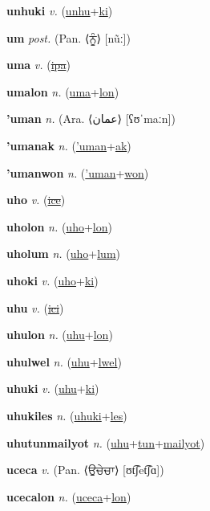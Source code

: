 \textbf{\hypertarget{unhuki}{unhuki}} \textit{v.} (\hyperlink{unhu}{unhu}+\allowbreak \hyperlink{ki}{ki})


\textbf{\hypertarget{um}{um}} \textit{post.} (Pan. ⟨{\gurmukhi{}ਨੂੰ}⟩ [nũː])


\textbf{\hypertarget{uma}{uma}} \textit{v.} (\hyperlink{ipa}{\sout{ipa}})


\textbf{\hypertarget{umalon}{umalon}} \textit{n.} (\hyperlink{uma}{uma}+\allowbreak \hyperlink{lon}{lon})


\textbf{\hypertarget{'uman}{'uman}} \textit{n.} (Ara. ⟨{\arabics{}عمان‎}⟩ [ʕʊˈmaːn])


\textbf{\hypertarget{'umanak}{'umanak}} \textit{n.} (\hyperlink{'uman}{'uman}+\allowbreak \hyperlink{ak}{ak})


\textbf{\hypertarget{'umanwon}{'umanwon}} \textit{n.} (\hyperlink{'uman}{'uman}+\allowbreak \hyperlink{won}{won})


\textbf{\hypertarget{uho}{uho}} \textit{v.} (\hyperlink{ice}{\sout{ice}})


\textbf{\hypertarget{uholon}{uholon}} \textit{n.} (\hyperlink{uho}{uho}+\allowbreak \hyperlink{lon}{lon})


\textbf{\hypertarget{uholum}{uholum}} \textit{n.} (\hyperlink{uho}{uho}+\allowbreak \hyperlink{lum}{lum})


\textbf{\hypertarget{uhoki}{uhoki}} \textit{v.} (\hyperlink{uho}{uho}+\allowbreak \hyperlink{ki}{ki})


\textbf{\hypertarget{uhu}{uhu}} \textit{v.} (\hyperlink{ici}{\sout{ici}})


\textbf{\hypertarget{uhulon}{uhulon}} \textit{n.} (\hyperlink{uhu}{uhu}+\allowbreak \hyperlink{lon}{lon})


\textbf{\hypertarget{uhulwel}{uhulwel}} \textit{n.} (\hyperlink{uhu}{uhu}+\allowbreak \hyperlink{lwel}{lwel})


\textbf{\hypertarget{uhuki}{uhuki}} \textit{v.} (\hyperlink{uhu}{uhu}+\allowbreak \hyperlink{ki}{ki})


\textbf{\hypertarget{uhukiles}{uhukiles}} \textit{n.} (\hyperlink{uhuki}{uhuki}+\allowbreak \hyperlink{les}{les})


\textbf{\hypertarget{uhutunmailyot}{uhutunmailyot}} \textit{n.} (\hyperlink{uhu}{uhu}+\allowbreak \hyperlink{tun}{tun}+\allowbreak \hyperlink{mailyot}{mailyot})


\textbf{\hypertarget{uceca}{uceca}} \textit{v.} (Pan. ⟨{\gurmukhi{}ਉਚੇਚਾ}⟩ [ʊt͡ʃet͡ʃɑ])


\textbf{\hypertarget{ucecalon}{ucecalon}} \textit{n.} (\hyperlink{uceca}{uceca}+\allowbreak \hyperlink{lon}{lon})


